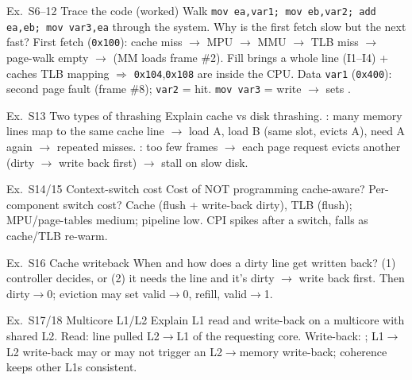 \begin{example2}{Ex.\ S6--12 Trace the code (worked)}
    Walk \texttt{mov ea,var1; mov eb,var2; add ea,eb; mov var3,ea} through the system. Why is the first fetch slow but the next fast?
    \tcblower
    First fetch (\texttt{0x100}): cache miss $\to$ MPU $\to$ MMU $\to$ TLB miss $\to$ page-walk empty $\to$  (MM loads frame \#2). Fill brings a whole line (I1--I4) + caches TLB mapping $\Rightarrow$ \texttt{0x104},\texttt{0x108} are  inside the CPU. Data \texttt{var1} (\texttt{0x400}): second page fault (frame \#8); \texttt{var2} = hit. \texttt{mov var3} = write $\to$ sets .
\end{example2}

\begin{example2}{Ex.\ S13 Two types of thrashing}
    Explain cache vs disk thrashing.
    \tcblower
    : many memory lines map to the same cache line $\to$ load A, load B (same slot, evicts A), need A again $\to$ repeated misses. : too few frames $\to$ each page request evicts another (dirty $\to$ write back first) $\to$ stall on slow disk.
\end{example2}

\begin{example2}{Ex.\ S14/15 Context-switch cost}
    Cost of NOT programming cache-aware? Per-component switch cost?
    \tcblower
    Cache  (flush + write-back dirty), TLB  (flush); MPU/page-tables medium; pipeline low. CPI spikes after a switch, falls as cache/TLB re-warm.
\end{example2}

\begin{example2}{Ex.\ S16 Cache writeback}
    When and how does a dirty line get written back?
    \tcblower
    (1) controller decides, or (2) it needs the line and it's dirty $\to$ write back first. Then dirty$\to$0; eviction may set valid$\to$0, refill, valid$\to$1.
\end{example2}

\begin{example2}{Ex.\ S17/18 Multicore L1/L2}
    Explain L1 read and write-back on a multicore with shared L2.
    \tcblower
    Read: line pulled L2$\to$L1 of the requesting core. Write-back: ; L1$\to$L2 write-back may or may not trigger an L2$\to$memory write-back; coherence keeps other L1s consistent.
\end{example2}

